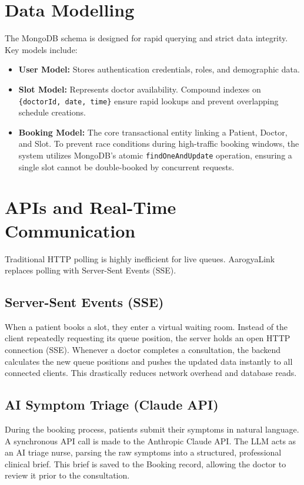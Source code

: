 \documentclass[12pt, a4paper]{article}
\begin{document}
\section{Data Modelling}
The MongoDB schema is designed for rapid querying and strict data integrity. Key models include:
\begin{itemize}[label=\textbullet]
    \item \textbf{User Model:} Stores authentication credentials, roles, and demographic data.
    \item \textbf{Slot Model:} Represents doctor availability. Compound indexes on \texttt{\{doctorId, date, time\}} ensure rapid lookups and prevent overlapping schedule creations.
    \item \textbf{Booking Model:} The core transactional entity linking a Patient, Doctor, and Slot. To prevent race conditions during high-traffic booking windows, the system utilizes MongoDB's atomic \texttt{findOneAndUpdate} operation, ensuring a single slot cannot be double-booked by concurrent requests.
\end{itemize}

\section{APIs and Real-Time Communication}
Traditional HTTP polling is highly inefficient for live queues. AarogyaLink replaces polling with Server-Sent Events (SSE).

\subsection{Server-Sent Events (SSE)}
When a patient books a slot, they enter a virtual waiting room. Instead of the client repeatedly requesting its queue position, the server holds an open HTTP connection (SSE). Whenever a doctor completes a consultation, the backend calculates the new queue positions and pushes the updated data instantly to all connected clients. This drastically reduces network overhead and database reads.

\subsection{AI Symptom Triage (Claude API)}
During the booking process, patients submit their symptoms in natural language. A synchronous API call is made to the Anthropic Claude API. The LLM acts as an AI triage nurse, parsing the raw symptoms into a structured, professional clinical brief. This brief is saved to the Booking record, allowing the doctor to review it prior to the consultation.
\end{document}
